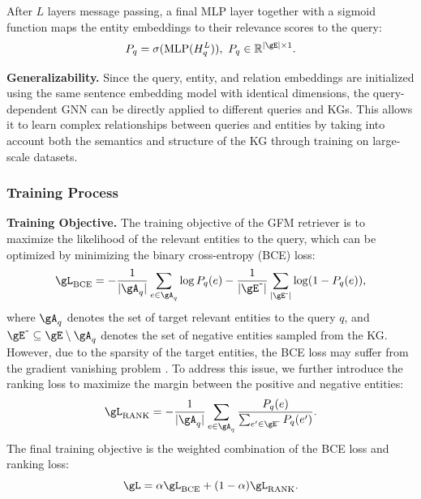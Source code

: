 After $L$ layers message passing, a final MLP layer together with a sigmoid function maps the entity embeddings to their relevance scores to the query:
\begin{equation}
    \setlength\abovedisplayskip{2pt}%
    \setlength\belowdisplayskip{2pt}
    P_q = \sigma(\text{MLP}(H_q^L)),~P_q\in\mathbb{R}^{|\gE|\times 1}.
\end{equation}

\noindent\textbf{Generalizability.} Since the query, entity, and relation embeddings are initialized using the same sentence embedding model with identical dimensions, the query-dependent GNN can be directly applied to different queries and KGs. This allows it to learn complex relationships between queries and entities by taking into account both the semantics and structure of the KG through training on large-scale datasets.

\subsubsection{Training Process}\label{sec:training}

\noindent\textbf{Training Objective.} The training objective of the GFM retriever is to maximize the likelihood of the relevant entities to the query, which can be optimized by minimizing the binary cross-entropy (BCE) loss:
\begin{equation}
    \setlength\abovedisplayskip{3pt}%
    \setlength\belowdisplayskip{3pt}
    \gL_{\text{BCE}} = -\frac{1}{|\gA_q|}\sum_{e\in\gA_q} \log P_q(e) - \frac{1}{|\gE^{\texttt{-}}|}\sum_{|\gE^{\texttt{-}}|} \log (1-P_q(e)), 
\end{equation}
where $\gA_q$ denotes the set of target relevant entities to the query $q$, and $\gE^{\texttt{-}}\subseteq \gE\setminus \gA_q$ denotes the set of negative entities sampled from the KG. However, due to the sparsity of the target entities, the BCE loss may suffer from the gradient vanishing problem \citep{lin2024understanding}. To address this issue, we further introduce the ranking loss \citep{bai2023regression} to maximize the margin between the positive and negative entities:
\begin{equation}
    \setlength\abovedisplayskip{2pt}%
    \setlength\belowdisplayskip{2pt}
    \gL_{\text{RANK}} = - \frac{1}{|\gA_q|}\sum_{e\in\gA_q} \frac{P_q(e)}{\sum_{e'\in\gE^{\texttt{-}}} P_q(e')}.
\end{equation}
The final training objective is the weighted combination of the BCE loss and ranking loss:
\begin{equation}
    \setlength\abovedisplayskip{2pt}%
    \setlength\belowdisplayskip{2pt}
    \gL = \alpha\gL_{\text{BCE}} + (1-\alpha) \gL_{\text{RANK}}.\label{eq:training}
\end{equation}

